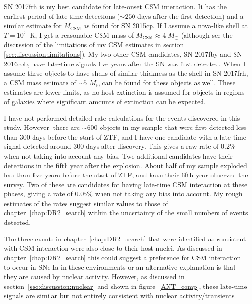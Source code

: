 \documentclass[a4paper,oneside,12pt, class=Latex/Classes/PhDthesisPSnPDF, crop=false]{standalone}
\begin{document}
SN 2017frh is my best candidate for late-onset CSM interaction. It has the earliest period of late-time detections ($\sim 250$ days after the first detection) and a similar estimate for $M_\text{CSM}$ as \citet{2015cp} found for SN 2015cp. If I assume a nova-like shell at $T=10^7$~K, I get a reasonable CSM mass of $M_\text{CSM} \approx 4$ $M_\odot$ (although see the discussion of the limitations of my CSM estimates in section \ref{sec:discussion:limitations}). My two other CSM candidates, SN 2017fby and SN 2016cob, have late-time signals five years after the SN was first detected. When I assume these objects to have shells of similar thickness as the shell in SN 2017frh, a CSM mass estimate of $\sim 5$ $M_\odot$ can be found for these objects as well. These estimates are lower limits, as no host extinction is assumed for objects in regions of galaxies where significant amounts of extinction can be expected.

I have not performed detailed rate calculations for the events discovered in this study. However, there are $\sim600$ objects in my sample that were first detected less than 300 days before the start of ZTF, and I have one candidate with a late-time signal detected around 300 days after discovery. This gives a raw rate of 0.2\% when not taking into account any bias. Two additional candidates have their detections in the fifth year after the explosion. About half of my sample exploded less than five years before the start of ZTF, and have their fifth year observed the survey. Two of these are candidates for having late-time CSM interaction at these phases, giving a rate of 0.05\% when not taking any bias into account. My rough estimates of the rates suggest similar values to those of chapter~\ref{chap:DR2_search}  within the uncertainty of the small numbers of events detected.

The three events in chapter~\ref{chap:DR2_search} that were identified as consistent with CSM interaction were also close to their host nuclei. As discussed in chapter~\ref{chap:DR2_search}  this could suggest a preference for CSM interaction to occur in SNe Ia in these environments or an alternative explanation is that they are caused by nuclear activity. However, as discussed in section~\ref{sec:discussion:nuclear} and shown in figure~\ref{ANT_comp}, these late-time signals are similar but not entirely consistent with nuclear activity/transients.
\end{document}
